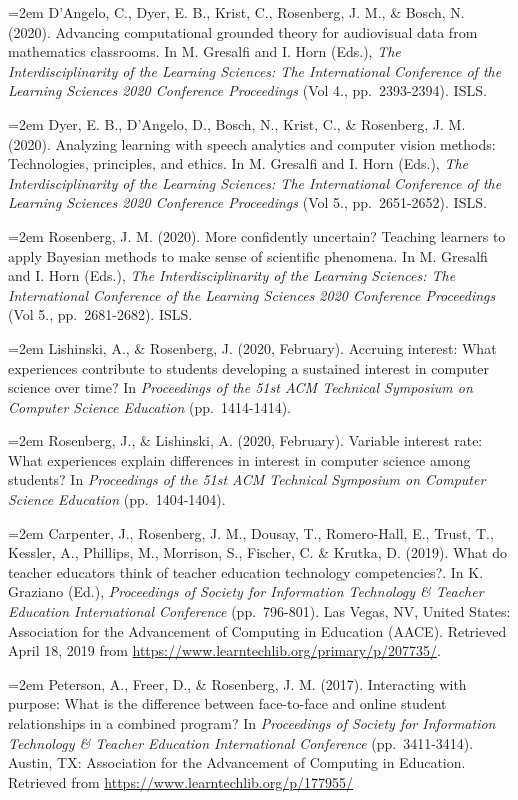\documentclass[
  14,
]{article}
\begin{document}
\hangindent=2em D'Angelo, C., Dyer, E. B., Krist, C., Rosenberg, J. M.,
\& Bosch, N. (2020). Advancing computational grounded theory for
audiovisual data from mathematics classrooms. In M. Gresalfi and I. Horn
(Eds.), \emph{The Interdisciplinarity of the Learning Sciences: The
International Conference of the Learning Sciences 2020 Conference
Proceedings} (Vol 4., pp.~2393-2394). ISLS.

\hangindent=2em Dyer, E. B., D'Angelo, D., Bosch, N., Krist, C., \&
Rosenberg, J. M. (2020). Analyzing learning with speech analytics and
computer vision methods: Technologies, principles, and ethics. In M.
Gresalfi and I. Horn (Eds.), \emph{The Interdisciplinarity of the
Learning Sciences: The International Conference of the Learning Sciences
2020 Conference Proceedings} (Vol 5., pp.~2651-2652). ISLS.

\hangindent=2em Rosenberg, J. M. (2020). More confidently uncertain?
Teaching learners to apply Bayesian methods to make sense of scientific
phenomena. In M. Gresalfi and I. Horn (Eds.), \emph{The
Interdisciplinarity of the Learning Sciences: The International
Conference of the Learning Sciences 2020 Conference Proceedings} (Vol
5., pp.~2681-2682). ISLS.

\hangindent=2em Lishinski, A., \& Rosenberg, J. (2020, February).
Accruing interest: What experiences contribute to students developing a
sustained interest in computer science over time? In \emph{Proceedings
of the 51st ACM Technical Symposium on Computer Science Education}
(pp.~1414-1414).

\hangindent=2em Rosenberg, J., \& Lishinski, A. (2020, February).
Variable interest rate: What experiences explain differences in interest
in computer science among students? In \emph{Proceedings of the 51st ACM
Technical Symposium on Computer Science Education} (pp.~1404-1404).

\hangindent=2em Carpenter, J., Rosenberg, J. M., Dousay, T.,
Romero-Hall, E., Trust, T., Kessler, A., Phillips, M., Morrison, S.,
Fischer, C. \& Krutka, D. (2019). What do teacher educators think of
teacher education technology competencies?. In K. Graziano (Ed.),
\emph{Proceedings of Society for Information Technology \& Teacher
Education International Conference} (pp.~796-801). Las Vegas, NV, United
States: Association for the Advancement of Computing in Education
(AACE). Retrieved April 18, 2019 from
\url{https://www.learntechlib.org/primary/p/207735/}.

\hangindent=2em Peterson, A., Freer, D., \& Rosenberg, J. M. (2017).
Interacting with purpose: What is the difference between face-to-face
and online student relationships in a combined program? In
\emph{Proceedings of Society for Information Technology \& Teacher
Education International Conference} (pp.~3411-3414). Austin, TX:
Association for the Advancement of Computing in Education. Retrieved
from \url{https://www.learntechlib.org/p/177955/}
\end{document}
